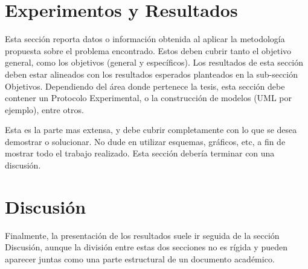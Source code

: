 \section{Experimentos y Resultados}

Esta sección reporta datos o información obtenida al aplicar la metodología propuesta sobre el problema encontrado. Estos deben cubrir tanto el objetivo general, como los objetivos (general y específicos). Los resultados de esta sección deben estar alineados con los resultados esperados planteados en la sub-sección Objetivos. Dependiendo del área donde pertenece la tesis, esta sección debe contener un Protocolo Experimental, o la construcción de modelos (UML por ejemplo), entre otros.

Esta es la parte mas extensa, y debe cubrir completamente con lo que se desea demostrar o solucionar. No dude en utilizar esquemas, gráficos, etc, a fin de mostrar todo el trabajo realizado. Esta sección debería terminar con una discusión.

\section{Discusión}

Finalmente, la presentación de los resultados suele ir seguida de la sección Discusión, aunque la división entre estas dos secciones no es rígida y pueden aparecer juntas como una parte estructural de un documento académico.
